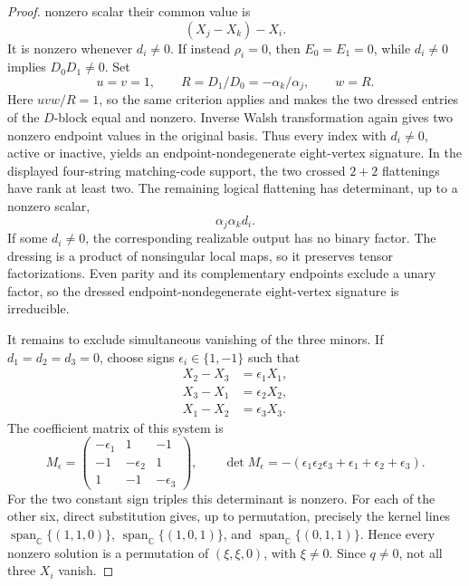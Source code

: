 \documentclass[11pt,letterpaper,onecolumn]{article}
\theoremstyle{plain}
\theoremstyle{definition}
\theoremstyle{remark}
\newcommand{\Span}{\operatorname{span}}
\begin{document}
\begin{proof}
nonzero scalar their common value is
\[
 (X_j-X_k)-X_i.
\]
It is nonzero whenever \(d_i\ne0\).  If instead \(\rho_i=0\),
then \(E_0=E_1=0\), while \(d_i\ne0\) implies
\(D_0D_1\ne0\).  Set
\[
 u=v=1,
 \qquad R=D_1/D_0=-\alpha_k/\alpha_j,
 \qquad w=R.
\]
Here \(uvw/R=1\), so the same criterion applies and makes the two dressed
entries of the \(D\)-block equal and nonzero.  Inverse Walsh transformation again gives two
nonzero endpoint values in the original basis.  Thus every index with \(d_i\ne0\),
active or inactive, yields an endpoint-nondegenerate eight-vertex
  signature.  In the displayed four-string matching-code support, the two
  crossed \(2+2\) flattenings have rank at least two. The remaining logical
  flattening has determinant, up to a nonzero scalar,
\begin{equation*}
  \alpha_j\alpha_kd_i.
\end{equation*}
If some \(d_i\ne0\), the corresponding realizable output has no binary
factor.  The dressing is a product of nonsingular local maps, so it preserves
tensor factorizations.  Even parity and its complementary endpoints exclude a unary factor,
so the dressed endpoint-nondegenerate eight-vertex signature is irreducible.

It remains to exclude simultaneous vanishing of the three minors.  If
\(d_1=d_2=d_3=0\), choose signs
\(\epsilon_i\in\{1,-1\}\) such that
\hypertarget{eq:proper-cyclic-simultaneous-zero}{}
\begin{equation*}
 \begin{aligned}
  X_2-X_3&=\epsilon_1X_1,\\
  X_3-X_1&=\epsilon_2X_2,\\
  X_1-X_2&=\epsilon_3X_3.
 \end{aligned}
\end{equation*}
The coefficient matrix of this system is
\[
 M_\epsilon=
 \begin{pmatrix}
  -\epsilon_1&1&-1\\
  -1&-\epsilon_2&1\\
  1&-1&-\epsilon_3
 \end{pmatrix},
 \qquad
 \det M_\epsilon
 =-(\epsilon_1\epsilon_2\epsilon_3+
     \epsilon_1+\epsilon_2+\epsilon_3).
\]
For the two constant sign triples this determinant is nonzero.  For each of
the other six, direct substitution gives, up to permutation, precisely the
kernel lines
\(\Span_{\mathbb C}\{(1,1,0)\}\),
\(\Span_{\mathbb C}\{(1,0,1)\}\), and
\(\Span_{\mathbb C}\{(0,1,1)\}\).  Hence every nonzero solution is a permutation of
  \((\xi,\xi,0)\), with \(\xi\ne0\).  Since \(q\ne0\), not all three
  \(X_i\) vanish.


\end{proof}
\end{document}
